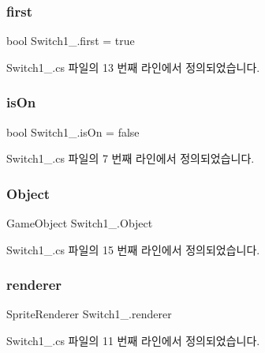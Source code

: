 \subsubsection{\texorpdfstring{first}{first}}
{\footnotesize\ttfamily bool Switch1\+\_.\+first = true\hspace{0.3cm}{\ttfamily [private]}}



Switch1\+\_.\+cs 파일의 13 번째 라인에서 정의되었습니다.

\mbox{\label{class_switch1__1_af6e2e065d1dda36fc6005b0952f13db9}} 
\subsubsection{\texorpdfstring{isOn}{isOn}}
{\footnotesize\ttfamily bool Switch1\+\_.\+is\+On = false}



Switch1\+\_.\+cs 파일의 7 번째 라인에서 정의되었습니다.

\mbox{\label{class_switch1__1_ace09c75d8c3db97d688cd90f57607a26}} 
\subsubsection{\texorpdfstring{Object}{Object}}
{\footnotesize\ttfamily Game\+Object Switch1\+\_.\+Object}



Switch1\+\_.\+cs 파일의 15 번째 라인에서 정의되었습니다.

\mbox{\label{class_switch1__1_aea94d9e939ac4afc0a49305ab8f4db14}} 
\subsubsection{\texorpdfstring{renderer}{renderer}}
{\footnotesize\ttfamily Sprite\+Renderer Switch1\+\_.\+renderer\hspace{0.3cm}{\ttfamily [private]}}



Switch1\+\_.\+cs 파일의 11 번째 라인에서 정의되었습니다.

